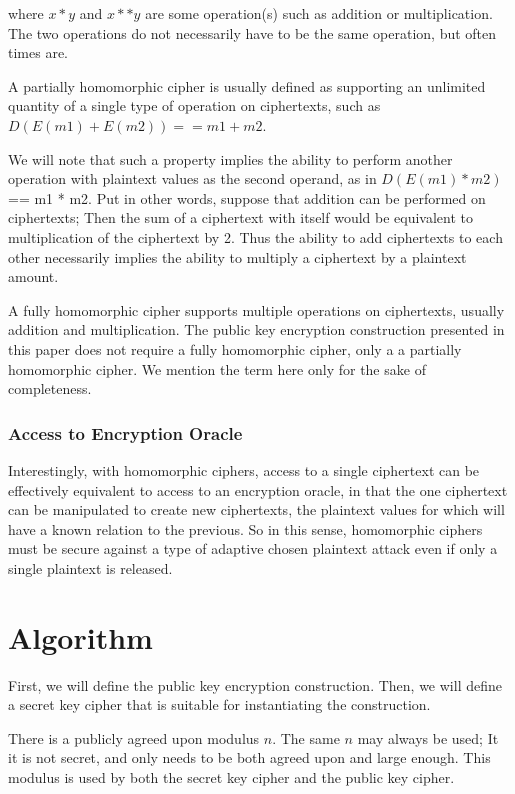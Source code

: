 \documentclass[preprint]{iacrtrans}
\begin{document}
where $x * y$ and $x ** y$ are some operation(s) such as addition or multiplication. The two operations do not necessarily have to be the same operation, but often times are.

A partially homomorphic cipher is usually defined as supporting an unlimited quantity of a single type of operation on ciphertexts, such as $D(E(m1) + E(m2)) == m1 + m2$.

We will note that such a property implies the ability to perform another operation with plaintext values as the second operand, as in $D(E(m1) * m2)$ == m1 * m2. Put in other words, suppose that addition can be performed on ciphertexts; Then the sum of a ciphertext with itself would be equivalent to multiplication of the ciphertext by 2. Thus the ability to add ciphertexts to each other necessarily implies the ability to multiply a ciphertext by a plaintext amount.

A fully homomorphic cipher supports multiple operations on ciphertexts, usually addition and multiplication. The public key encryption construction presented in this paper does not require a fully homomorphic cipher, only a a partially homomorphic cipher. We mention the term here only for the sake of completeness.

\subsubsection{Access to Encryption Oracle}
Interestingly, with homomorphic ciphers, access to a single ciphertext can be effectively equivalent to access to an encryption oracle, in that the one ciphertext can be manipulated to create new ciphertexts, the plaintext values for which will have a known relation to the previous. So in this sense, homomorphic ciphers must be secure against a type of adaptive chosen plaintext attack even if only a single plaintext is released.

\section{Algorithm}
First, we will define the public key encryption construction. Then, we will define a secret key cipher that is suitable for instantiating the construction.

There is a publicly agreed upon modulus $n$. The same $n$ may always be used; It it is not secret, and only needs to be both agreed upon and large enough. This modulus is used by both the secret key cipher and the public key cipher.
\end{document}
